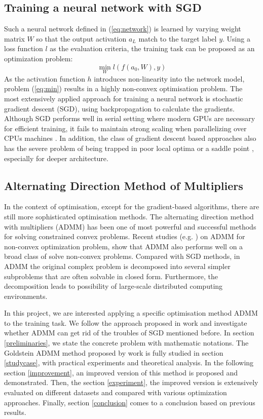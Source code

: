 \documentclass[letterpaper, 10 pt, conference]{ieeeconf}  %
\begin{document}
\subsection{Training a neural network with SGD }
Such a neural network defined in (\ref{eq:network}) is learned by varying weight matrix $W$ so that the output activation $a_L$ match to the target label $y$. Using a loss function $l$ as the evaluation criteria, the training task can be proposed as an optimization problem:
\begin{equation} \label{eq:min}
	\min_{W} l(f(a_0, W), y)
\end{equation}
As the activation function $h$ introduces non-linearity into the network model, problem (\ref{eq:min}) results in a highly non-convex optimisation problem. The most extensively applied approach for training a neural network is stochastic gradient descent (SGD), using backpropagation to calculate the gradients.  Although SGD performs well in serial setting where modern GPUs are necessary for efficient training, it fails to maintain strong scaling when parallelizing over CPUs machines \cite{2}. In addition, the class of gradient descent based approaches also has the severe problem of being trapped in poor local optima \cite{3} or a saddle point \cite{4}, especially for deeper architecture. 

\subsection{Alternating Direction Method of Multipliers}
In the context of optimisation, except for the gradient-based algorithms, there are still more sophisticated optimisation methods. The alternating direction method with multipliers (ADMM) has been one of most powerful and successful methods for solving constrained convex problems. Recent studies (e.g. \cite{5, 6, 7, 8}) on ADMM for non-convex optimization problem, show that ADMM also performs well on a broad class of solve non-convex problems. Compared with SGD methods, in ADMM the original complex problem is decomposed into several simpler subproblems that are often solvable in closed form. Furthermore, the decomposition leads to possibility of large-scale distributed computing environments.

In this project, we are interested applying a specific optimisation method ADMM to the training task. We follow the approach proposed in work \cite{9} and investigate whether ADMM can get rid of the troubles of SGD mentioned before.  In section \ref{preliminaries}, we state the concrete problem with mathematic notations. The Goldstein ADMM method proposed by work \cite{9} is fully studied in section \ref{studycase}, with practical experiments and theoretical analysis. In the following section \ref{improvement}, an improved version of this method is proposed and demonstrated. Then, the section \ref{experiment}, the improved version is extensively evaluated on different datasets and compared with various optimization approaches. Finally, section \ref{conclusion} comes to a conclusion based on previous results.
\end{document}
